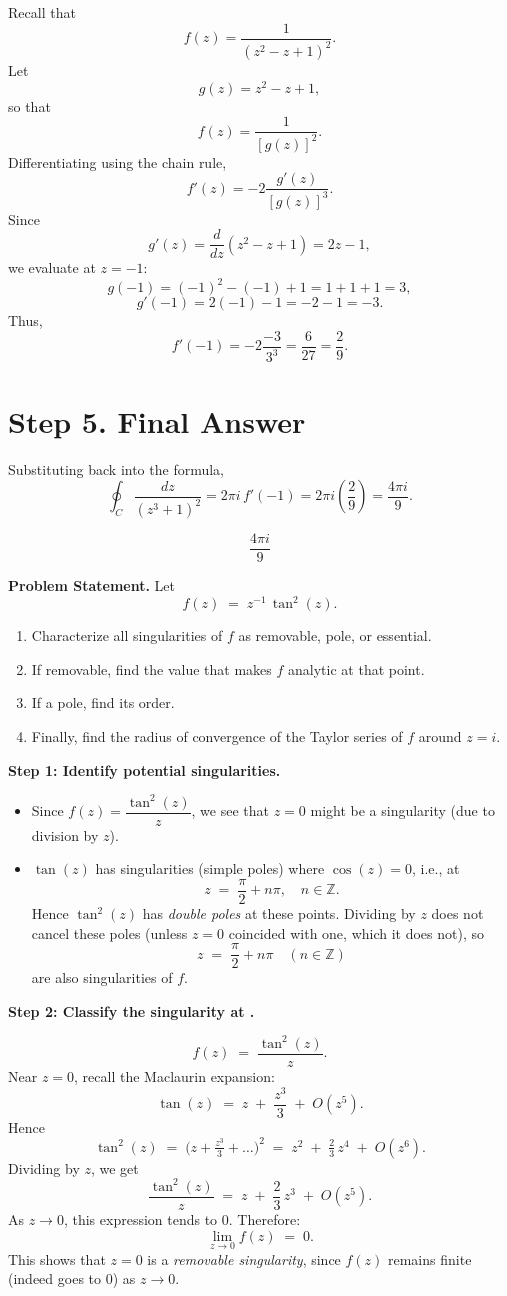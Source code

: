 \documentclass[12pt]{article}
\theoremstyle{definition} %
\theoremstyle{plain} %
\begin{document}
Recall that
\[
f(z) = \frac{1}{\left(z^2-z+1\right)^2}.
\]
Let
\[
g(z)=z^2-z+1,
\]
so that
\[
f(z) = \frac{1}{[g(z)]^2}.
\]
Differentiating using the chain rule,
\[
f'(z) = -2 \frac{g'(z)}{[g(z)]^3}.
\]
Since
\[
g'(z)=\frac{d}{dz}(z^2-z+1)=2z-1,
\]
we evaluate at \( z=-1 \):
\[
g(-1)=(-1)^2-(-1)+1=1+1+1=3,
\]
\[
g'(-1)=2(-1)-1=-2-1=-3.
\]
Thus,
\[
f'(-1) = -2\frac{-3}{3^3} = \frac{6}{27} = \frac{2}{9}.
\]

\section*{Step 5. Final Answer}

Substituting back into the formula,
\[
\oint_C \frac{dz}{\left(z^3+1\right)^2} = 2\pi i\, f'(-1) = 2\pi i \left(\frac{2}{9}\right) = \frac{4\pi i}{9}.
\]

\[
\boxed{\frac{4\pi i}{9}}
\]

\noindent
\textbf{Problem Statement.} Let
\[
f(z) \;=\; z^{-1} \,\tan^2(z).
\]
\begin{enumerate}
\item Characterize all singularities of $f$ as removable, pole, or essential.
\item If removable, find the value that makes $f$ analytic at that point.
\item If a pole, find its order.
\item Finally, find the radius of convergence of the Taylor series of $f$ around $z=i$.
\end{enumerate}

\medskip
\noindent
\textbf{Step 1: Identify potential singularities.}

\begin{itemize}
\item Since $f(z) = \dfrac{\tan^2(z)}{z}$, we see that $z=0$ might be a singularity (due to division by $z$).
\item $\tan(z)$ has singularities (simple poles) where $\cos(z) = 0$, i.e., at 
\[
z \;=\; \frac{\pi}{2} + n\pi, \quad n \in \mathbb{Z}.
\]
Hence $\tan^2(z)$ has \emph{double poles} at these points. Dividing by $z$ does not cancel these poles (unless $z=0$ coincided with one, which it does not), so
\[
z \;=\; \frac{\pi}{2} + n\pi \quad (n \in \mathbb{Z})
\]
are also singularities of $f$.
\end{itemize}

\medskip
\noindent
\textbf{Step 2: Classify the singularity at .}

\[
f(z) \;=\; \frac{\tan^2(z)}{z}.
\]
Near $z=0$, recall the Maclaurin expansion:
\[
\tan(z) \;=\; z \;+\; \frac{z^3}{3} \;+\; O(z^5).
\]
Hence
\[
\tan^2(z) \;=\; \bigl(z + \tfrac{z^3}{3} + \dots\bigr)^2 
\;=\; z^2 \;+\; \tfrac{2}{3}\,z^4 \;+\; O(z^6).
\]
Dividing by $z$, we get
\[
\frac{\tan^2(z)}{z} \;=\; z \;+\; \frac{2}{3}\,z^3 \;+\; O(z^5).
\]
As $z \to 0$, this expression tends to $0$. Therefore:
\[
\lim_{z \to 0} f(z) \;=\; 0.
\]
This shows that $z=0$ is a \emph{removable singularity}, since $f(z)$ remains finite (indeed goes to $0$) as $z \to 0$. 
\end{document}
